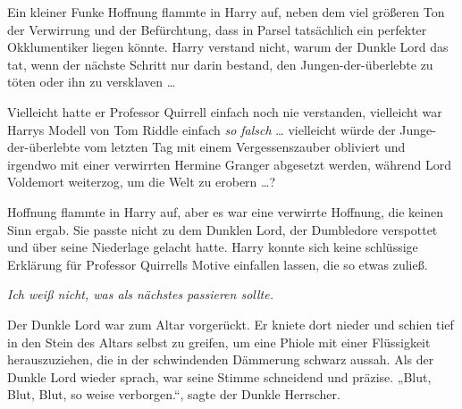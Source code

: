 Ein kleiner Funke Hoffnung flammte in Harry auf, neben dem viel größeren Ton der Verwirrung und der Befürchtung, dass in Parsel tatsächlich ein perfekter Okklumentiker liegen könnte. Harry verstand nicht, warum der Dunkle Lord das tat, wenn der nächste Schritt nur darin bestand, den Jungen-der-überlebte zu töten oder ihn zu versklaven …

Vielleicht hatte er Professor Quirrell einfach noch nie verstanden, vielleicht war Harrys Modell von Tom Riddle einfach \emph{so falsch} … vielleicht würde der Junge-der-überlebte vom letzten Tag mit einem Vergessenszauber obliviert und irgendwo mit einer verwirrten Hermine Granger abgesetzt werden, während Lord Voldemort weiterzog, um die Welt zu erobern …?

Hoffnung flammte in Harry auf, aber es war eine verwirrte Hoffnung, die keinen Sinn ergab. Sie passte nicht zu dem Dunklen Lord, der Dumbledore verspottet und über seine Niederlage gelacht hatte. Harry konnte sich keine schlüssige Erklärung für Professor Quirrells Motive einfallen lassen, die so etwas zuließ.

\emph{Ich weiß nicht, was als nächstes passieren sollte.}

Der Dunkle Lord war zum Altar vorgerückt. Er kniete dort nieder und schien tief in den Stein des Altars selbst zu greifen, um eine Phiole mit einer Flüssigkeit herauszuziehen, die in der schwindenden Dämmerung schwarz aussah.
Als der Dunkle Lord wieder sprach, war seine Stimme schneidend und präzise.
„Blut, Blut, Blut, so weise verborgen.“, sagte der Dunkle Herrscher.

